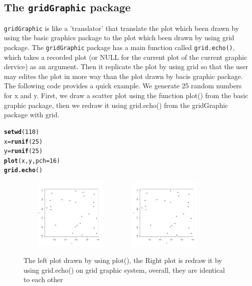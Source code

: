 \documentclass[a4paper,10pt]{article}\usepackage[]{graphicx}\usepackage[]{color}
\makeatletter
\newcommand{\hlnum}[1]{\textcolor[rgb]{0.686,0.059,0.569}{#1}}%
\newcommand{\hlstd}[1]{\textcolor[rgb]{0.345,0.345,0.345}{#1}}%
\newcommand{\hlkwb}[1]{\textcolor[rgb]{0.69,0.353,0.396}{#1}}%
\newcommand{\hlkwc}[1]{\textcolor[rgb]{0.333,0.667,0.333}{#1}}%
\newcommand{\hlkwd}[1]{\textcolor[rgb]{0.737,0.353,0.396}{\textbf{#1}}}%
\newenvironment{kframe}{%
 \def\at@end@of@kframe{}%
 \ifinner\ifhmode%
  \def\at@end@of@kframe{\end{minipage}}%
  \begin{minipage}{\columnwidth}%
 \fi\fi%
 \def\FrameCommand##1{\hskip\@totalleftmargin \hskip-\fboxsep
 \colorbox{shadecolor}{##1}\hskip-\fboxsep
     \hskip-\linewidth \hskip-\@totalleftmargin \hskip\columnwidth}%
 \MakeFramed {\advance\hsize-\width
   \@totalleftmargin\z@ \linewidth\hsize
   \@setminipage}}%
 {\par\unskip\endMakeFramed%
 \at@end@of@kframe}
\newenvironment{knitrout}{}{} %
\makeatother
\begin{document}
\subsection{The \texttt{gridGraphic} package}
\texttt{gridGraphic} is like a 'translator' that translate the plot which been drawn by using the basic graphics package to the plot which been drawn by using grid package. 
The \texttt{gridGraphic} package has a main function called \texttt{grid.echo()}, which takes a recorded plot (or NULL for the current plot of the current graphic dervice) as an argument. Then it replicate the 
plot by using grid so that the user may edites the plot in more way than the plot drawn by bacis graphic package.
The following code provides a quick example. We generate 25 random numbers for x and y. First, we draw a scatter plot using the function plot() from the basic graphic package, then we redraw it using grid.echo() from the gridGraphic package with grid.
\begin{knitrout}
\color{fgcolor}\begin{kframe}
\begin{alltt}
\hlkwd{setwd}\hlstd{(}\hlnum{110}\hlstd{)}
\hlstd{x} \hlkwb{=} \hlkwd{runif}\hlstd{(}\hlnum{25}\hlstd{)}
\hlstd{y} \hlkwb{=} \hlkwd{runif}\hlstd{(}\hlnum{25}\hlstd{)}
\hlkwd{plot}\hlstd{(x,y,} \hlkwc{pch} \hlstd{=} \hlnum{16}\hlstd{)}
\hlkwd{grid.echo}\hlstd{()}
\end{alltt}
\end{kframe}
\end{knitrout}
\begin{figure}[h]
\begin{center}
  \includegraphics[height = 3.5cm, width = 5cm]{figure/basic.pdf}
  \includegraphics[height = 3.5cm, width = 5cm]{figure/echo.pdf}
  \caption{The left plot drawn by using plot(), the Right plot is redraw it by using grid.echo() on grid graphic system, overall, they are identical to each other}
  	\label{figure1}
\end{center}
\end{figure}
\end{document}
